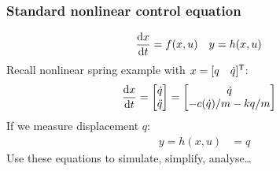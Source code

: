 \documentclass[10pt]{beamer-control}
\begin{document}
\begin{frame}
  \frametitle{Standard nonlinear control equation}
  \begin{align}
    \frac{\mathrm{d} x}{\mathrm{d} t} &= f(x,u) & y &= h(x,u)
  \end{align}
  Recall nonlinear spring example with $x = [q\quad \dot q]^{\mathsf T}$:
  \begin{align}
    \frac{\mathrm{d} x}{\mathrm{d} t} &= \begin{bmatrix}\dot q\\\ddot q\end{bmatrix} = \begin{bmatrix}\dot q\\- c(\dot q)/m - kq/m\end{bmatrix}
  \end{align}
  If we measure displacement $q$:
  \begin{align}
    y = h(x,u) &= q
  \end{align}
  Use these equations to simulate, simplify, analyse\dots

\end{frame}



\SUMMARYFRAME
\FINALE
\end{document}
